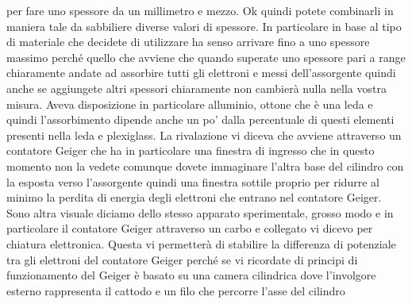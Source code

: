 per fare uno spessore da un millimetro e mezzo. Ok quindi potete combinarli in maniera tale da sabbiliere diverse valori di spessore. In particolare in base al tipo di materiale che decidete di utilizzare ha senso arrivare fino a uno spessore massimo perché quello che avviene che quando superate uno spessore pari a range chiaramente andate ad assorbire tutti gli elettroni e messi dell'assorgente quindi anche se aggiungete altri spessori chiaramente non cambierà nulla nella vostra misura. Aveva disposizione in particolare alluminio, ottone che è una leda e quindi l'assorbimento dipende anche un po' dalla percentuale di questi elementi presenti nella leda e plexiglass. La rivalazione vi diceva che avviene attraverso un contatore Geiger che ha in particolare una finestra di ingresso che in questo momento non la vedete comunque dovete immaginare l'altra base del cilindro con la esposta verso l'assorgente quindi una finestra sottile proprio per ridurre al minimo la perdita di energia degli elettroni che entrano nel contatore Geiger. Sono altra visuale diciamo dello stesso apparato sperimentale, grosso modo e in particolare il contatore Geiger attraverso un carbo e collegato vi dicevo per chiatura elettronica. Questa vi permetterà di stabilire la differenza di potenziale tra gli elettroni del contatore Geiger perché se vi ricordate di principi di funzionamento del Geiger è basato su una camera cilindrica dove l'involgore esterno rappresenta il cattodo e un filo che percorre l'asse del cilindro 

